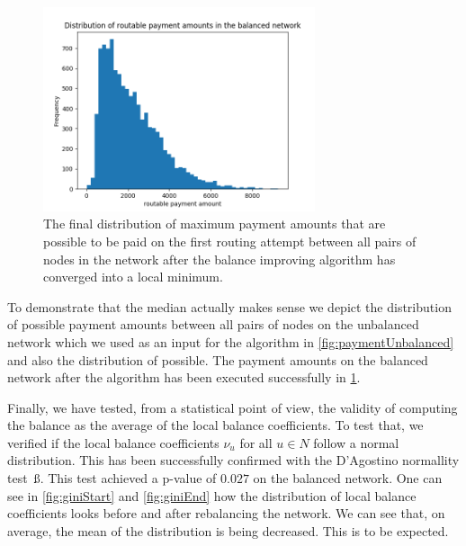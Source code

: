 \documentclass[a4paper]{paper}
\begin{document}
\begin{figure}
 \centering
 \includegraphics[width=8cm]{code/results/routabilityTest/paymentamtBalanced.png}
 \caption{The final distribution of maximum payment amounts that are possible to be paid on the first routing attempt between all pairs of nodes in the network after the balance improving algorithm has converged into a local minimum.}
 \label{fig:paymentBalanced}
\end{figure}

To demonstrate that the median actually makes sense we depict 
the distribution of possible payment amounts between all pairs
of nodes on the unbalanced network which we used as an input for 
the algorithm in \cref{fig:paymentUnbalanced} and also the distribution of possible. 
The payment amounts on the balanced network after the algorithm has been executed 
successfully in \cref{fig:paymentBalanced}.

Finally, we have tested, from a statistical point of view, the validity of computing the balance as the average of the local balance coefficients.
To test that, we verified if the local balance coefficients $\nu_u$ for all $u \in N$ follow a normal distribution. This has been successfully confirmed with the D'Agostino normallity test~ß\cite{d1971omnibus}.
This test achieved a p-value of $0.027$ on the balanced network.
One can see in \cref{fig:giniStart} and \cref{fig:giniEnd} how the distribution of local balance coefficients looks before and after rebalancing the network. We can see that, on average, the mean of the distribution is being decreased. This is to be expected. 
\end{document}
